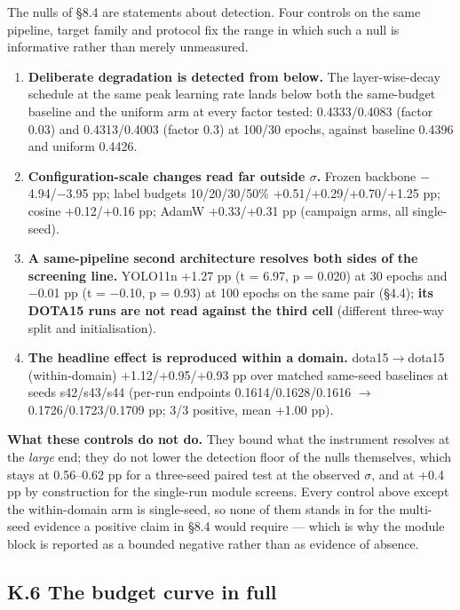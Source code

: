 \documentclass[pdflatex,sn-mathphys-ay]{sn-jnl}
\begin{document}
The nulls of \S{}8.4 are statements about detection. Four controls on the same pipeline, target family and protocol fix the range in which such a null is informative rather than merely unmeasured.

\begin{enumerate}
\item \textbf{Deliberate degradation is detected from below.} The layer-wise-decay schedule at the same peak learning rate lands below both the same-budget baseline and the uniform arm at every factor tested: 0.4333/0.4083 (factor 0.03) and 0.4313/0.4003 (factor 0.3) at 100/30 epochs, against baseline 0.4396 and uniform 0.4426.
\item \textbf{Configuration-scale changes read far outside \ensuremath{\sigma}.} Frozen backbone \ensuremath{-}4.94/\ensuremath{-}3.95 pp; label budgets 10/20/30/50\% +0.51/+0.29/+0.70/+1.25 pp; cosine +0.12/+0.16 pp; AdamW +0.33/+0.31 pp (campaign arms, all single-seed).
\item \textbf{A same-pipeline second architecture resolves both sides of the screening line.} YOLO11n +1.27 pp (t = 6.97, p = 0.020) at 30 epochs and \ensuremath{-}0.01 pp (t = \ensuremath{-}0.10, p = 0.93) at 100 epochs on the same pair (\S{}4.4); \textbf{its DOTA15 runs are not read against the third cell} (different three-way split and initialisation).
\item \textbf{The headline effect is reproduced within a domain.} dota15\ensuremath{\rightarrow}dota15 (within-domain) +1.12/+0.95/+0.93 pp over matched same-seed baselines at seeds s42/s43/s44 (per-run endpoints 0.1614/0.1628/0.1616 \ensuremath{\rightarrow} 0.1726/0.1723/0.1709 pp; 3/3 positive, mean +1.00 pp).
\end{enumerate}

\textbf{What these controls do not do.} They bound what the instrument resolves at the \emph{large} end; they do not lower the detection floor of the nulls themselves, which stays at 0.56--0.62 pp for a three-seed paired test at the observed \ensuremath{\sigma}, and at +0.4 pp by construction for the single-run module screens. Every control above except the within-domain arm is single-seed, so none of them stands in for the multi-seed evidence a positive claim in \S{}8.4 would require --- which is why the module block is reported as a bounded negative rather than as evidence of absence.

\subsection*{K.6 The budget curve in full}
\end{document}
